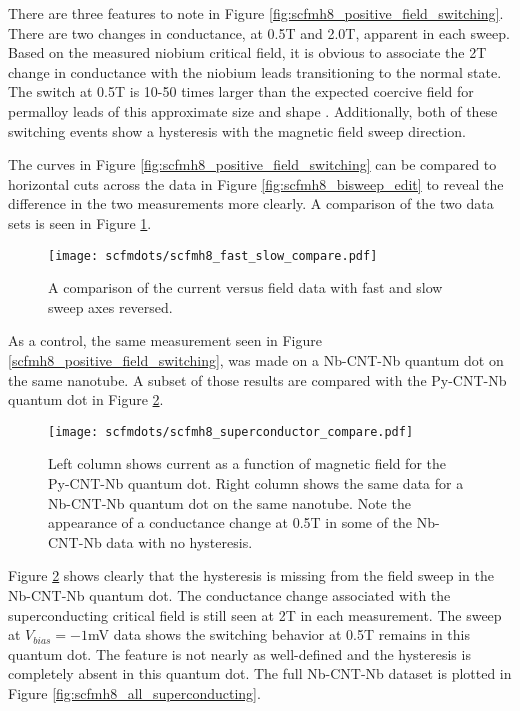 There are three features to note in Figure \ref{fig:scfmh8_positive_field_switching}. There are two changes in conductance, at 0.5T and 2.0T, apparent in each sweep. Based on the measured niobium critical field, it is obvious to associate the 2T change in conductance with the niobium leads transitioning to the normal state. The switch at 0.5T is 10-50 times larger than the expected coercive field for permalloy leads of this approximate size and shape \cite{Aurich2010, Preusche2009}. Additionally, both of these switching events show a hysteresis with the magnetic field sweep direction. 

The curves in Figure \ref{fig:scfmh8_positive_field_switching} can be compared to horizontal cuts across the data in Figure \ref{fig:scfmh8_bisweep_edit} to reveal the difference in the two measurements more clearly. A comparison of the two data sets is seen in Figure \ref{fig:scfmh8_fast_slow_compare}. 

\begin{figure}
    \centering
    \texttt{[image: scfmdots/scfmh8\_fast\_slow\_compare.pdf]}
    \caption{A comparison of the current versus field data with fast and slow sweep axes reversed.}
    \label{fig:scfmh8_fast_slow_compare}
\end{figure}

As a control, the same measurement seen in Figure \ref{scfmh8_positive_field_switching},  was made on a Nb-CNT-Nb quantum dot on the same nanotube. A subset of those results are compared with the Py-CNT-Nb quantum dot in Figure \ref{fig:scfmh8_superconductor_compare}.

\begin{figure}
    \centering
    \texttt{[image: scfmdots/scfmh8\_superconductor\_compare.pdf]}
    \caption{Left column shows current as a function of magnetic field for the Py-CNT-Nb quantum dot. Right column shows the same data for a Nb-CNT-Nb quantum dot on the same nanotube. Note the appearance of a conductance change at 0.5T in some of the Nb-CNT-Nb data with no hysteresis.}
    \label{fig:scfmh8_superconductor_compare}
\end{figure}

Figure \ref{fig:scfmh8_superconductor_compare} shows clearly that the hysteresis is missing from the field sweep in the Nb-CNT-Nb quantum dot. The conductance change associated with the superconducting critical field is still seen at 2T in each measurement. The sweep at $V_{bias}=-1$mV data shows the switching behavior at 0.5T remains in this quantum dot. The feature is not nearly as well-defined and the hysteresis is completely absent in this quantum dot. The full Nb-CNT-Nb dataset is plotted in Figure \ref{fig:scfmh8_all_superconducting}. 

